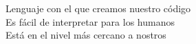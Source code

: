 \documentclass[preview]{standalone}
\begin{document}
Lenguaje con el que creamos nuestro código\\Es fácil de interpretar para los humanos\\Está en el nivel más cercano a nostros\\
\end{document}

